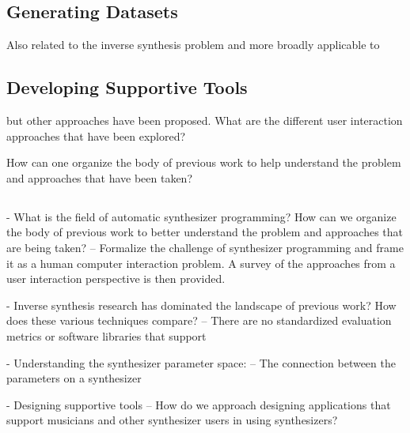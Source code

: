 \subsection{Generating Datasets}
Also related to the inverse synthesis problem and more broadly applicable to 


\subsection{Developing Supportive Tools}


but other approaches have been proposed. What are the different user interaction approaches that have been explored? 

How can one organize the body of previous work to help understand the problem and approaches that have been taken?

\subsection{}


- What is the field of automatic synthesizer programming? How can we organize the body of previous work to better understand the problem and approaches that are being taken?
-- Formalize the challenge of synthesizer programming and frame it as a human computer interaction problem. A survey of the approaches from a user interaction perspective is then provided.

- Inverse synthesis research has dominated the landscape of previous work? How does these various techniques compare?
-- There are no standardized evaluation metrics or software libraries that support 

- Understanding the synthesizer parameter space:
-- The connection between the parameters on a synthesizer 

- Designing supportive tools
-- How do we approach designing applications that support musicians and other synthesizer users in using synthesizers?


